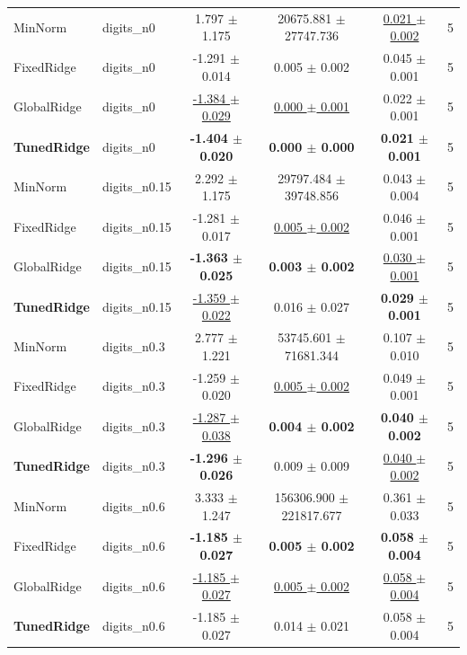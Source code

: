 \begin{tabular}{llcccc}
\midrule
MinNorm & digits\_n0 & 1.797 $\pm$ 1.175 & 20675.881 $\pm$ 27747.736 & \underline{0.021 $\pm$ 0.002} & 5 \\
FixedRidge & digits\_n0 & -1.291 $\pm$ 0.014 & 0.005 $\pm$ 0.002 & 0.045 $\pm$ 0.001 & 5 \\
GlobalRidge & digits\_n0 & \underline{-1.384 $\pm$ 0.029} & \underline{0.000 $\pm$ 0.001} & 0.022 $\pm$ 0.001 & 5 \\
\textbf{TunedRidge} & digits\_n0 & \textbf{-1.404 $\pm$ 0.020} & \textbf{0.000 $\pm$ 0.000} & \textbf{0.021 $\pm$ 0.001} & 5 \\
\midrule
MinNorm & digits\_n0.15 & 2.292 $\pm$ 1.175 & 29797.484 $\pm$ 39748.856 & 0.043 $\pm$ 0.004 & 5 \\
FixedRidge & digits\_n0.15 & -1.281 $\pm$ 0.017 & \underline{0.005 $\pm$ 0.002} & 0.046 $\pm$ 0.001 & 5 \\
GlobalRidge & digits\_n0.15 & \textbf{-1.363 $\pm$ 0.025} & \textbf{0.003 $\pm$ 0.002} & \underline{0.030 $\pm$ 0.001} & 5 \\
\textbf{TunedRidge} & digits\_n0.15 & \underline{-1.359 $\pm$ 0.022} & 0.016 $\pm$ 0.027 & \textbf{0.029 $\pm$ 0.001} & 5 \\
\midrule
MinNorm & digits\_n0.3 & 2.777 $\pm$ 1.221 & 53745.601 $\pm$ 71681.344 & 0.107 $\pm$ 0.010 & 5 \\
FixedRidge & digits\_n0.3 & -1.259 $\pm$ 0.020 & \underline{0.005 $\pm$ 0.002} & 0.049 $\pm$ 0.001 & 5 \\
GlobalRidge & digits\_n0.3 & \underline{-1.287 $\pm$ 0.038} & \textbf{0.004 $\pm$ 0.002} & \textbf{0.040 $\pm$ 0.002} & 5 \\
\textbf{TunedRidge} & digits\_n0.3 & \textbf{-1.296 $\pm$ 0.026} & 0.009 $\pm$ 0.009 & \underline{0.040 $\pm$ 0.002} & 5 \\
\midrule
MinNorm & digits\_n0.6 & 3.333 $\pm$ 1.247 & 156306.900 $\pm$ 221817.677 & 0.361 $\pm$ 0.033 & 5 \\
FixedRidge & digits\_n0.6 & \textbf{-1.185 $\pm$ 0.027} & \textbf{0.005 $\pm$ 0.002} & \textbf{0.058 $\pm$ 0.004} & 5 \\
GlobalRidge & digits\_n0.6 & \underline{-1.185 $\pm$ 0.027} & \underline{0.005 $\pm$ 0.002} & \underline{0.058 $\pm$ 0.004} & 5 \\
\textbf{TunedRidge} & digits\_n0.6 & -1.185 $\pm$ 0.027 & 0.014 $\pm$ 0.021 & 0.058 $\pm$ 0.004 & 5 \\
\bottomrule
\end{tabular}
